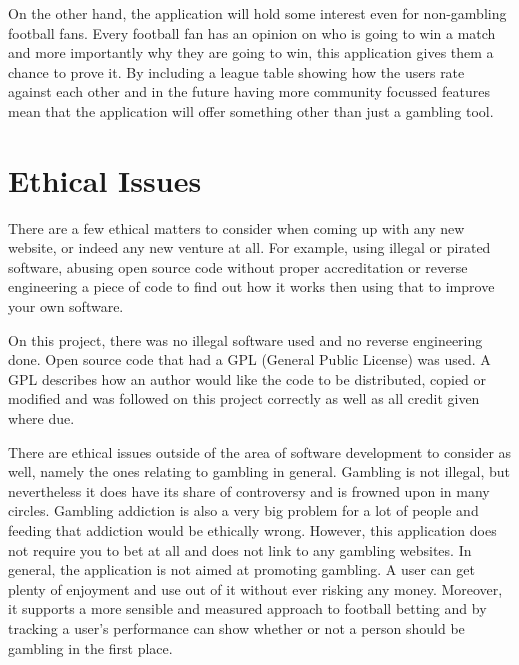 On the other hand,  the application will hold some interest even for non-gambling football fans. Every football fan has an opinion on who is going to win a match and more importantly why they are going to win, this application gives them a chance to prove it. By including a league table showing how the users rate against each other and in the future having more community focussed features mean that the application will offer something other than just a gambling tool.

\section{Ethical Issues}
\label{sec:ethicalissues_lesp}
There are a few ethical matters to consider when coming up with any new website, or indeed any new venture at all. For example, using illegal or pirated software, abusing open source code without proper accreditation or reverse engineering a piece of code to find out how it works then using that to improve your own software.  

On this project, there was no illegal software used and no reverse engineering done. Open source code that had a GPL (General Public License) was used. A GPL describes how an author would like the code to be distributed, copied or modified and was followed on this project correctly as well as all credit given where due.  

There are ethical issues outside of the area of software development to consider as well, namely the ones relating to gambling in general. Gambling is not illegal, but nevertheless it does have its share of controversy and is frowned upon in many circles. Gambling addiction is also a very big problem for a lot of people and feeding that addiction would be ethically wrong. However, this application does not require you to bet at all and does not link to any gambling websites. In general, the application is not aimed at promoting gambling. A user can get plenty of enjoyment and use out of it without ever risking any money.  Moreover, it supports a more sensible and measured approach to football betting and by tracking a user’s performance can show whether or not a person should be gambling in the first place.